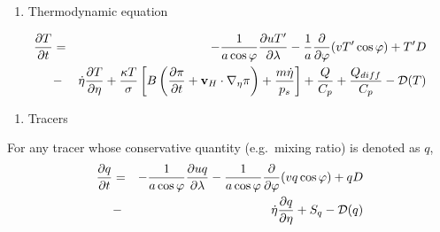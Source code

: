 \begin{enumerate}
\def\labelenumi{\arabic{enumi}.}
\tightlist
\item
  Thermodynamic equation
\end{enumerate}

\begin{eqnarray}
  \frac{\partial T}{\partial t}
     &=&  - \frac{1}{a\cos\varphi}
               \frac{\partial uT'}{\partial \lambda}
          - \frac{1}{a}
               \frac{\partial }{\partial \varphi} ( vT' \cos\varphi )
          + T' D \notag \\
        &-& \dot{\eta}
              \frac{\partial T }{\partial \eta}
          + \frac{\kappa T}{\sigma} \left[ B\left( \frac{\partial \pi}{\partial t}
                            + {\mathbf{v}}_{H} \cdot \nabla_{\eta}\pi \right)
                            + \frac{ m\dot{\eta} }{ p_s }
                     \right]
          + \frac{Q}{C_{p}}
          + \frac{Q_{diff}}{C_{p}}
          - {\mathcal D}(T)   \end{eqnarray}

\begin{enumerate}
\def\labelenumi{\arabic{enumi}.}
\tightlist
\item
  Tracers
\end{enumerate}

For any tracer whose conservative quantity (e.g.~mixing ratio) is denoted as \(q\), \begin{eqnarray}
  \frac{\partial q}{\partial t}
   &=&  - \frac{1}{a\cos\varphi}
               \frac{\partial uq}{\partial \lambda}
          - \frac{1}{a\cos\varphi}
               \frac{\partial }{\partial \varphi} (vq \cos\varphi)
          + q D \notag \\
        &-& \dot{\eta} \frac{\partial q }{\partial \eta}
          + S_{q}
          - {\mathcal D}(q)   \end{eqnarray}

